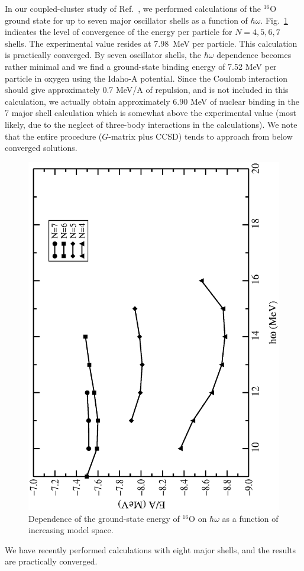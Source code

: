 \documentclass{ws-procs9x6}
\begin{document}
In our coupled-cluster study of Ref.~\cite{ref1}, 
we performed calculations of 
the $^{16}$O ground state for up to seven major oscillator 
shells as a function of $\hbar\omega$. 
Fig.~\ref{fig_ox_hw} indicates the level of convergence
of the energy per particle for $N=4,5,6,7$ shells. The experimental value
resides at 7.98~MeV per particle.  This calculation is practically converged.
By seven oscillator shells, the $\hbar\omega$ dependence becomes rather
minimal and we find a ground-state binding energy of 7.52 MeV per particle in
oxygen using the Idaho-A potential. Since the Coulomb interaction should give
approximately 0.7 MeV/A of repulsion, and is not included in this
calculation, we actually obtain approximately 6.90 MeV of nuclear binding
in the 7 major shell calculation which is somewhat above the experimental
value (most likely, due to the neglect of three-body interactions in the
calculations). We note that the entire procedure ($G$-matrix plus CCSD) tends to
approach from below converged solutions.
\begin{figure}
\begin{center}
\includegraphics[angle=270, scale=0.35]{figure_ccsd_ox.eps}
\caption{Dependence of the ground-state energy of $^{16}$O  on $\hbar\omega$
as a function of increasing model space.}
\label{fig_ox_hw}
\end{center}
\end{figure}
We have recently performed calculations with eight major shells, and the 
results are practically converged.
 
\end{document}
